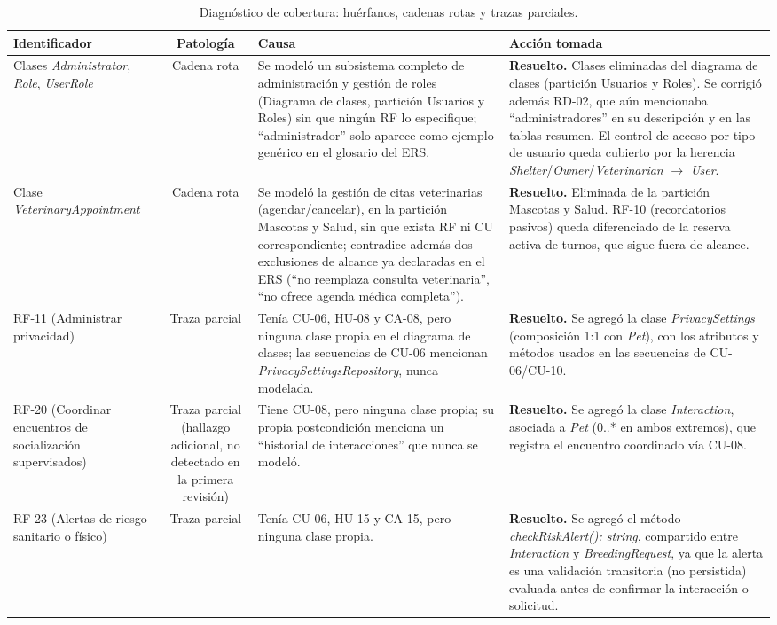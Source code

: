 \documentclass[journal,onecolumn]{IEEEtran}
\begin{document}
\begin{table}[H]
	\centering
	\caption{Diagnóstico de cobertura: huérfanos, cadenas rotas y trazas parciales.}
	\label{tab:diagnostico_cobertura}
	\small
	\begin{tabularx}{\textwidth}{|X|c|X|X|}
		\hline
		\textbf{Identificador} & \textbf{Patología} & \textbf{Causa} & \textbf{Acción tomada} \\
		\hline
		Clases \textit{Administrator}, \textit{Role}, \textit{UserRole} & Cadena rota & Se modeló un subsistema completo de administración y gestión de roles (Diagrama de clases, partición Usuarios y Roles) sin que ningún RF lo especifique; ``administrador'' solo aparece como ejemplo genérico en el glosario del ERS. & \textbf{Resuelto.} Clases eliminadas del diagrama de clases (partición Usuarios y Roles). Se corrigió además RD-02, que aún mencionaba ``administradores'' en su descripción y en las tablas resumen. El control de acceso por tipo de usuario queda cubierto por la herencia \textit{Shelter}/\textit{Owner}/\textit{Veterinarian} $\to$ \textit{User}. \\
		\hline
		Clase \textit{VeterinaryAppointment} & Cadena rota & Se modeló la gestión de citas veterinarias (agendar/cancelar), en la partición Mascotas y Salud, sin que exista RF ni CU correspondiente; contradice además dos exclusiones de alcance ya declaradas en el ERS (``no reemplaza consulta veterinaria'', ``no ofrece agenda médica completa''). & \textbf{Resuelto.} Eliminada de la partición Mascotas y Salud. RF-10 (recordatorios pasivos) queda diferenciado de la reserva activa de turnos, que sigue fuera de alcance. \\
		\hline
		RF-11 (Administrar privacidad) & Traza parcial & Tenía CU-06, HU-08 y CA-08, pero ninguna clase propia en el diagrama de clases; las secuencias de CU-06 mencionan \textit{PrivacySettingsRepository}, nunca modelada. & \textbf{Resuelto.} Se agregó la clase \textit{PrivacySettings} (composición 1:1 con \textit{Pet}), con los atributos y métodos usados en las secuencias de CU-06/CU-10. \\
		\hline
		RF-20 (Coordinar encuentros de socialización supervisados) & Traza parcial (hallazgo adicional, no detectado en la primera revisión) & Tiene CU-08, pero ninguna clase propia; su propia postcondición menciona un ``historial de interacciones'' que nunca se modeló. & \textbf{Resuelto.} Se agregó la clase \textit{Interaction}, asociada a \textit{Pet} (0..* en ambos extremos), que registra el encuentro coordinado vía CU-08. \\
		\hline
		RF-23 (Alertas de riesgo sanitario o físico) & Traza parcial & Tenía CU-06, HU-15 y CA-15, pero ninguna clase propia. & \textbf{Resuelto.} Se agregó el método \textit{checkRiskAlert(): string}, compartido entre \textit{Interaction} y \textit{BreedingRequest}, ya que la alerta es una validación transitoria (no persistida) evaluada antes de confirmar la interacción o solicitud. \\
		\hline
	\end{tabularx}
\end{table}
\end{document}
